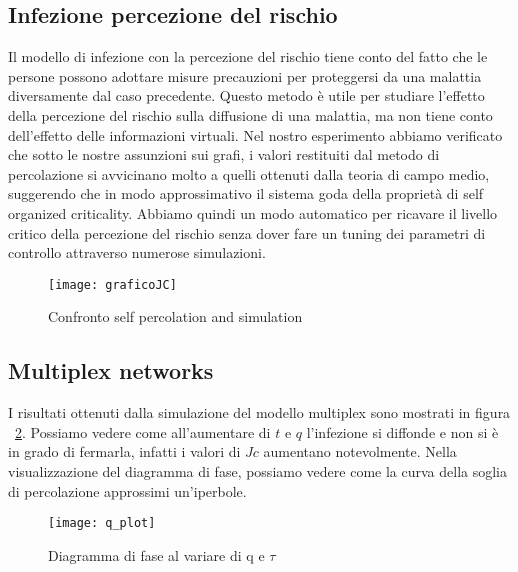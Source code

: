 \subsection{Infezione percezione del rischio}\label{subsec:res-infezione-con-la-percezione-del-rischio}
    Il modello di infezione con la percezione del rischio tiene conto del fatto che le persone possono adottare misure
    precauzioni per proteggersi da una malattia diversamente dal caso precedente.
    Questo metodo è utile per studiare l'effetto della percezione del rischio sulla diffusione di una malattia, ma non
    tiene conto dell'effetto delle informazioni virtuali. Nel nostro esperimento abbiamo verificato che 
    sotto le nostre assunzioni sui grafi, i valori restituiti dal metodo di percolazione si avvicinano molto
    a quelli ottenuti dalla teoria di campo medio, suggerendo che in modo approssimativo il sistema goda della 
    proprietà di self organized criticality. Abbiamo quindi un modo automatico per ricavare il livello critico
    della percezione del rischio senza dover fare un tuning dei parametri di controllo attraverso numerose
    simulazioni.
    \begin{figure}[h]
        \texttt{[image: graficoJC]}\caption{Confronto self percolation and simulation}
        \label{fig:graficoJC}
    \end{figure}

\subsection{Multiplex networks}\label{subsec:res-multiplex-networks}
    I risultati ottenuti dalla simulazione del modello multiplex sono mostrati in figura ~\ref{fig:diagram_phase}.
    Possiamo vedere come all'aumentare di $t$ e $q$ l'infezione si diffonde e non si è in grado di fermarla, infatti i
    valori di $Jc$ aumentano notevolmente.
    Nella visualizzazione del diagramma di fase, possiamo vedere come la curva della soglia di percolazione approssimi 
    un'iperbole.

    \begin{figure}[h]
        \texttt{[image: q\_plot]}\label{fig:diagram_phase}
        \caption{Diagramma di fase al variare di q e $\tau$}
    \end{figure}
